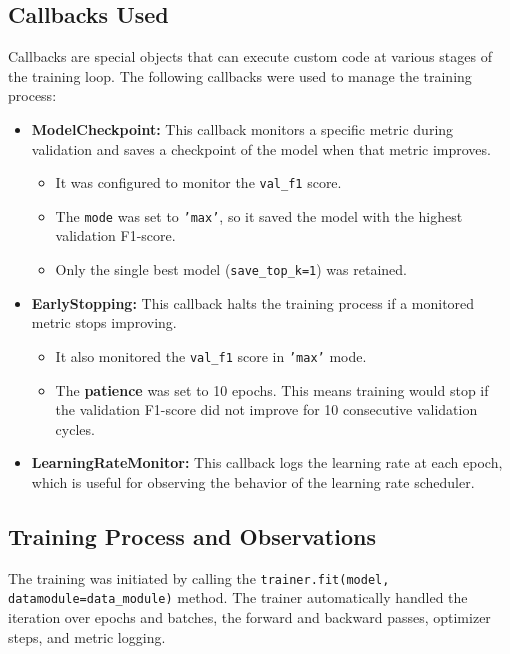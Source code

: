 \documentclass[11pt, a4paper]{article}
\begin{document}
\subsection{Callbacks Used}
Callbacks are special objects that can execute custom code at various stages of the training loop. The following callbacks were used to manage the training process:
\begin{itemize}
    \item \textbf{ModelCheckpoint:} This callback monitors a specific metric during validation and saves a checkpoint of the model when that metric improves.
        \begin{itemize}
            \item It was configured to monitor the \texttt{val\_f1} score.
            \item The \texttt{mode} was set to \texttt{'max'}, so it saved the model with the highest validation F1-score.
            \item Only the single best model (\texttt{save\_top\_k=1}) was retained.
        \end{itemize}
    \item \textbf{EarlyStopping:} This callback halts the training process if a monitored metric stops improving.
        \begin{itemize}
            \item It also monitored the \texttt{val\_f1} score in \texttt{'max'} mode.
            \item The \textbf{patience} was set to 10 epochs. This means training would stop if the validation F1-score did not improve for 10 consecutive validation cycles.
        \end{itemize}
    \item \textbf{LearningRateMonitor:} This callback logs the learning rate at each epoch, which is useful for observing the behavior of the learning rate scheduler.
\end{itemize}

\subsection{Training Process and Observations}
The training was initiated by calling the \texttt{trainer.fit(model, datamodule=data\_module)} method. The trainer automatically handled the iteration over epochs and batches, the forward and backward passes, optimizer steps, and metric logging.
\end{document}
